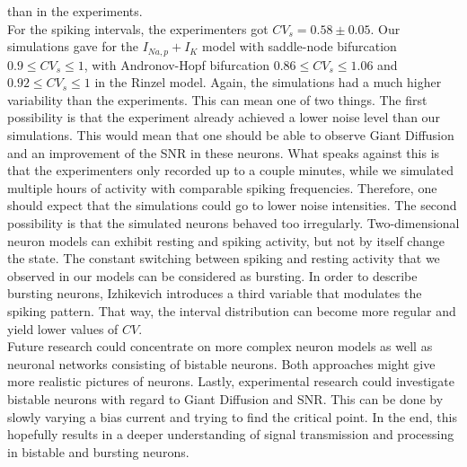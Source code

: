 \documentclass[12pt,a4paper]{article}
\begin{document}
than in the experiments. \\
For the spiking intervals, the experimenters got $CV_s=0.58\pm0.05$. Our simulations gave for the $I_{Na,p}+I_K$ model with saddle-node bifurcation $0.9\leq CV_s\leq 1$, with Andronov-Hopf bifurcation $0.86\leq CV_s\leq 1.06$ and $0.92\leq CV_s\leq 1$ in the Rinzel model. Again, the simulations had a much higher variability than the experiments. This can mean one of two things. The first possibility is that the experiment already achieved a lower noise level than our simulations. This would mean that one should be able to observe Giant Diffusion and an improvement of the SNR in these neurons. What speaks against this is that the experimenters only recorded up to a couple minutes, while we simulated multiple hours of activity with comparable spiking frequencies. Therefore, one should expect that the simulations could go to lower noise intensities. The second possibility is that the simulated neurons behaved too irregularly. Two-dimensional neuron models can exhibit resting and spiking activity, but not by itself change the state. The constant switching between spiking and resting activity that we observed in our models can be considered as bursting. In order to describe bursting neurons, Izhikevich\cite{izi} introduces a third variable that modulates the spiking pattern. That way, the interval distribution can become more regular and yield lower values of $CV$. \\
Future research could concentrate on more complex neuron models as well as neuronal networks consisting of bistable neurons. Both approaches might give more realistic pictures of neurons. Lastly, experimental research could investigate bistable neurons with regard to Giant Diffusion and SNR. This can be done by slowly varying a bias current and trying to find the critical point. In the end, this hopefully results in a deeper understanding of signal transmission and processing in bistable and bursting neurons. 



\end{document}
